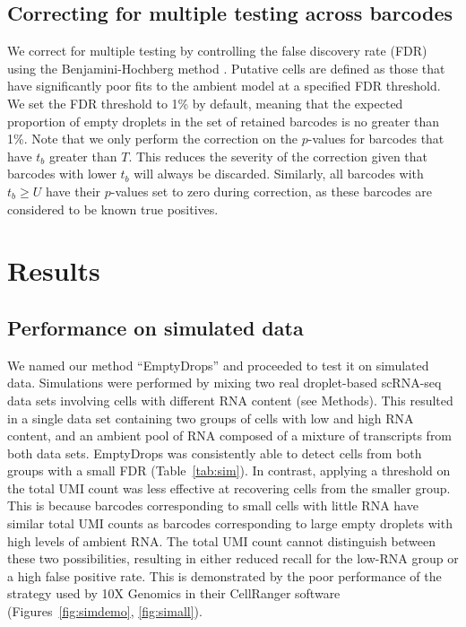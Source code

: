 \documentclass[10pt,letterpaper]{article}
\begin{document}
\subsection*{Correcting for multiple testing across barcodes}
We correct for multiple testing by controlling the false discovery rate (FDR) using the Benjamini-Hochberg method \cite{benjamini1995controlling}.
Putative cells are defined as those that have significantly poor fits to the ambient model at a specified FDR threshold.
We set the FDR threshold to 1\% by default, meaning that the expected proportion of empty droplets in the set of retained barcodes is no greater than 1\%.
Note that we only perform the correction on the $p$-values for barcodes that have $t_b$ greater than $T$.
This reduces the severity of the correction given that barcodes with lower $t_b$ will always be discarded.
Similarly, all barcodes with $t_b \ge U$ have their $p$-values set to zero during correction, as these barcodes are considered to be known true positives.

\section*{Results}

\subsection*{Performance on simulated data}
We named our method ``EmptyDrops'' and proceeded to test it on simulated data.
Simulations were performed by mixing two real droplet-based scRNA-seq data sets involving cells with different RNA content (see Methods).
This resulted in a single data set containing two groups of cells with low and high RNA content, and an ambient pool of RNA composed of a mixture of transcripts from both data sets.
EmptyDrops was consistently able to detect cells from both groups with a small FDR (Table~\ref{tab:sim}).
In contrast, applying a threshold on the total UMI count was less effective at recovering cells from the smaller group.
This is because barcodes corresponding to small cells with little RNA have similar total UMI counts as barcodes corresponding to large empty droplets with high levels of ambient RNA.
The total UMI count cannot distinguish between these two possibilities, resulting in either reduced recall for the low-RNA group or a high false positive rate.
This is demonstrated by the poor performance of the strategy used by 10X Genomics in their CellRanger software (Figures~\ref{fig:simdemo}, \ref{fig:simall}).
\end{document}
